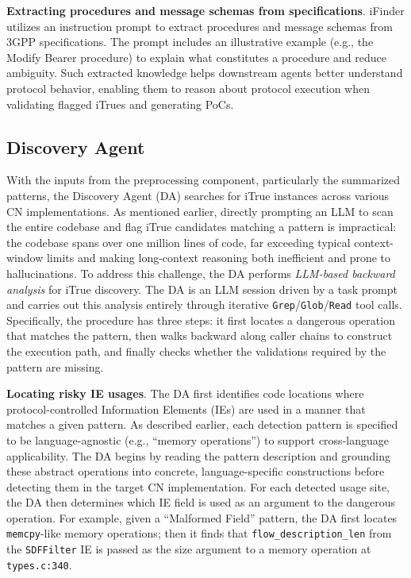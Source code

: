 \vspace{2pt}\noindent\textbf{Extracting procedures and message schemas from specifications}. 
iFinder utilizes an instruction prompt to extract procedures and message schemas from 3GPP specifications. The prompt includes an illustrative example (e.g., the Modify Bearer procedure) to explain what constitutes a procedure and reduce ambiguity. Such extracted knowledge helps downstream agents better understand protocol behavior,
enabling them to reason about protocol execution when validating flagged iTrues and generating PoCs.

\subsection{Discovery Agent}
\label{sec:discovery agent}
With the inputs from the preprocessing component, particularly the summarized patterns, the Discovery Agent (DA) searches for iTrue instances across various CN implementations. 
As mentioned earlier, directly prompting an LLM to scan the entire codebase and flag iTrue candidates matching a pattern is impractical: the codebase spans over one million lines of code, far exceeding typical context-window limits and making long-context reasoning both inefficient and prone to hallucinations.
To address this challenge, the DA performs \textit{LLM-based backward analysis} for iTrue discovery. 
The DA is an LLM session driven by a task prompt and carries out this analysis entirely through iterative \texttt{Grep}/\texttt{Glob}/\texttt{Read} tool calls.
Specifically, the procedure has three steps: it first locates a dangerous operation that matches the pattern, then walks backward along caller chains to construct the execution path, and finally checks whether the validations required by the pattern are missing.

\noindent\textbf{Locating risky IE usages}.
The DA first identifies code locations where protocol-controlled Information Elements (IEs) are used in a manner that matches a given pattern. 
As described earlier, each detection pattern is specified to be language-agnostic (e.g., ``memory operations'') to support cross-language applicability. 
The DA begins by reading the pattern description and grounding these abstract operations into concrete, language-specific constructions before detecting them in the target CN implementation. For each detected usage site, the DA then determines which IE field is used as an argument to the dangerous operation.
For example, given a ``Malformed Field'' pattern, the DA first locates \texttt{memcpy}-like memory operations; then it finds that \texttt{flow\_description\_len} from the \texttt{SDFFilter} IE is passed as the size argument to a memory operation at \texttt{types.c:340}.

